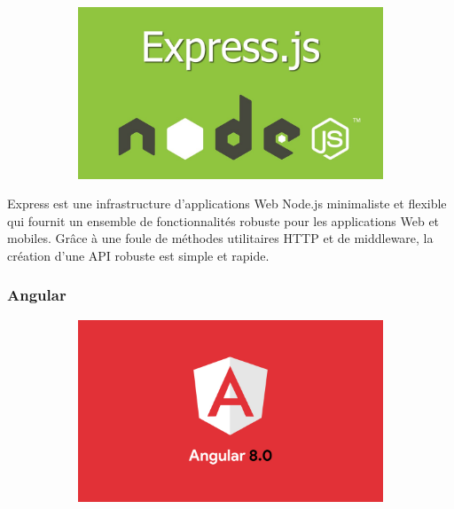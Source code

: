 \documentclass{article}
\begin{document}
\begin{figure}[h!]
	\centering
  	\begin{subfigure}[b]{0.4\linewidth}
    \includegraphics[width=\linewidth]{Express.jpeg}
  	\end{subfigure}
\end{figure}

Express est une infrastructure d'applications Web Node.js minimaliste et flexible qui fournit un ensemble de fonctionnalités robuste pour les applications Web et mobiles.
Grâce à une foule de méthodes utilitaires HTTP et de middleware, la création d'une API robuste est simple et rapide. 
\newpage
\subsubsection{Angular}

\begin{figure}[h!]
	\centering
  	\begin{subfigure}[b]{0.4\linewidth}
    \includegraphics[width=\linewidth]{Angular.jpeg}
  	\end{subfigure}
\end{figure}
\end{document}
